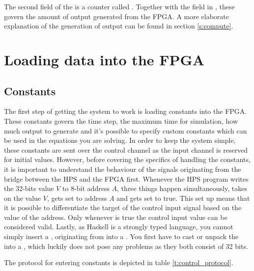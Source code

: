 The second field of the  is a counter called . Together with the  field in , these govern the amount of output generated from the FPGA. A more elaborate explanation of the generation of output can be found in section \ref{s:compute}.



\section{Loading data into the FPGA}
\subsection{Constants}


The first step of getting the system to work is loading constants into the FPGA. These constants govern the time step, the maximum time for simulation, how much output to generate and it's possible to specify custom constants which can be used in the equations you are solving. In order to keep the system simple, these constants are sent over the control channel as the input channel is reserved for initial values. However, before covering the specifics of handling the constants, it is important to understand the behaviour of the signals originating from the bridge between the HPS and the FPGA first. Whenever the HPS program writes the 32-bits value $V$ to 8-bit address $A$, three things happen simultaneously,  takes on the value $V$,  gets set to address $A$ and  gets set to true. This set up means that it is possible to differentiate the target of the control input signal based on the value of the address. Only whenever  is true the control input value can be considered valid. Lastly, as Haskell is a strongly typed language, you cannot simply insert a , originating from  into a . You first have to cast or unpack the  into a , which luckily does not pose any problems as they both consist of 32 bits.

The protocol for entering constants is depicted in table \ref{t:control_protocol}.

